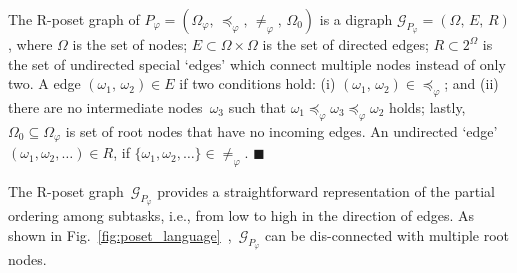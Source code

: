 \begin{definition}\label{def:poset-graph}
The R-poset graph of $P_{\varphi}=(\Omega_\varphi,\,\preceq_{\varphi},\,\neq_{\varphi},
\,\Omega_0)$ is a digraph $\mathcal{G}_{P_\varphi}=(\Omega,\,E,\,R)$,
where $\Omega$ is the set of nodes;
$E\subset \Omega \times \Omega$ is the set of directed edges;
$R\subset 2^\Omega$ is the set of undirected special `edges' which
connect multiple nodes instead of only two.
A edge $(\omega_1,\,\omega_2)\in E$ if two conditions hold:
(i) $(\omega_1,\, \omega_2)\in \preceq_{\varphi}$;
{and} (ii) there are no intermediate nodes~$\omega_3$ such that
$\omega_1\preceq_{\varphi} \omega_3 \preceq_{\varphi} \omega_2$ holds;
lastly, $\Omega_0\subseteq \Omega_\varphi$ is set of root nodes that 
have no incoming edges. An undirected `edge' $(\omega_1,\omega_2,\dots)\in R$, if $\{\omega_1,\omega_2,\dots\}\in \neq_{\varphi}$.
\hfill $\blacksquare$
 \end{definition}

The R-poset graph~$\mathcal{G}_{P_\varphi}$ provides a straightforward
representation of the partial ordering among subtasks,
i.e., from low to high in the direction of edges.
As shown in Fig.~\ref{fig:poset_language}~,~$\mathcal{G}_{P_\varphi}$ can be dis-connected with multiple root nodes.

